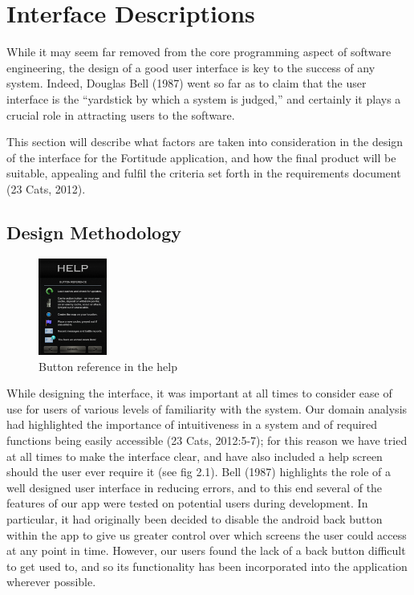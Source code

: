 \section{Interface Descriptions}
While it may seem far removed from the core programming aspect of software engineering, the design of a good user interface is key to the success of any system. Indeed, Douglas Bell (1987) went so far as to claim that the user interface is the “yardstick by which a system is judged,” and certainly it plays a crucial role in attracting users to the software.

This section will describe what factors are taken into consideration in the design of the interface for the Fortitude application, and how the final product will be suitable, appealing and fulfil the criteria set forth in the requirements document (23 Cats, 2012).

\subsection{Design Methodology}

\begin{figure}
	\vspace{-20pt}
	\begin{center}
	\includegraphics[width=0.2\textwidth]{images/interface1}
	\caption{Button reference in the help}
	\end{center}
	\vspace{-10pt}
\end{figure}

While designing the interface, it was important at all times to consider ease of use for users of various levels of familiarity with the system. Our domain analysis had highlighted the importance of intuitiveness in a system and of required functions being easily accessible (23 Cats, 2012:5-7); for this reason we have tried at all times to make the interface clear, and have also included a help screen should the user ever require it (see fig 2.1). Bell (1987) highlights the role of a well designed user interface in reducing errors, and to this end several of the features of our app were tested on potential users during development. In particular, it had originally been decided to disable the android back button within the app to give us greater control over which screens the user could access at any point in time. However, our users found the lack of a back button difficult to get used to, and so its functionality has been incorporated into the application wherever possible.

